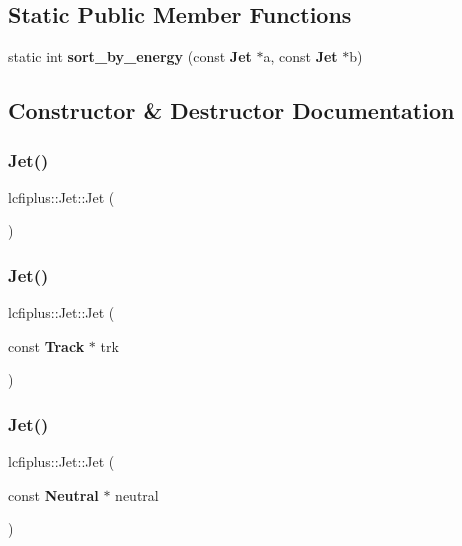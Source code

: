 \subsection*{Static Public Member Functions}
\begin{DoxyCompactItemize}
\item 
static int \textbf{ sort\+\_\+by\+\_\+energy} (const \textbf{ Jet} $\ast$a, const \textbf{ Jet} $\ast$b)
\end{DoxyCompactItemize}


\subsection{Constructor \& Destructor Documentation}
\mbox{\label{classlcfiplus_1_1Jet_a773e9c6e9ec95546ac65849135b80b2a}} 
\subsubsection{Jet()\hspace{0.1cm}{\footnotesize\ttfamily [1/5]}}
{\footnotesize\ttfamily lcfiplus\+::\+Jet\+::\+Jet (\begin{DoxyParamCaption}{ }\end{DoxyParamCaption})\hspace{0.3cm}{\ttfamily [inline]}}

\mbox{\label{classlcfiplus_1_1Jet_ad8a3a6421e868cfa94b48f7595073e34}} 
\subsubsection{Jet()\hspace{0.1cm}{\footnotesize\ttfamily [2/5]}}
{\footnotesize\ttfamily lcfiplus\+::\+Jet\+::\+Jet (\begin{DoxyParamCaption}\item[{const \textbf{ Track} $\ast$}]{trk }\end{DoxyParamCaption})}

\mbox{\label{classlcfiplus_1_1Jet_ac35f1ebf53f4e31f1d221f20a051a839}} 
\subsubsection{Jet()\hspace{0.1cm}{\footnotesize\ttfamily [3/5]}}
{\footnotesize\ttfamily lcfiplus\+::\+Jet\+::\+Jet (\begin{DoxyParamCaption}\item[{const \textbf{ Neutral} $\ast$}]{neutral }\end{DoxyParamCaption})}

